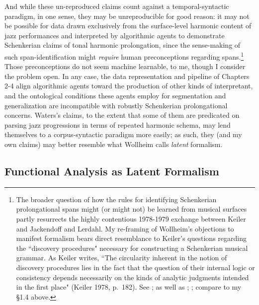 And while these un-reproduced claims count against a temporal-syntactic paradigm, in one sense, they may be unreproducible for good reason: it may not be possible for data drawn exclusively from the surface-level harmonic content of jazz performances and interpreted by algorithmic agents to demonstrate Schenkerian claims of tonal harmonic prolongation, since the sense-making of such span-identification might \emph{require} human preconceptions regarding spans.\footnote{The broader question of how the rules for identifying Schenkerian prolongational spans might (or might not) be learned from musical surfaces partly resurrects the highly contentious 1978-1979 exchange between Keiler and Jackendoff and Lerdahl.  My re-framing of Wollheim's objections to manifest formalism bears direct resemblance to Keiler's questions regarding the ``discovery procedures" necessary for constructing a Schenkerian musical grammar. As Keiler writes, ``The circularity inherent in the notion of discovery procedures lies in the fact that the question of their internal logic or consistency depends necessarily on the kinds of analytic judgments intended in the first place" (Keiler 1978, p.\ 182).  See \cite{keiler1978}; as well as \cite{jackendoff1979}; \cite{keiler1979}; compare to my \S 1.4 above.}  Those preconceptions do not seem machine learnable, to me, though I consider the problem open.  In any case, the data representation and pipeline of Chapters 2-4 align algorithmic agents toward the production of other kinds of interpretant, and the ontological conditions these agents employ for segmentation and generalization are incompatible with robustly Schenkerian prolongational concerns.  Waters's claims, to the extent that some of them are predicated on parsing jazz progressions in terms of repeated harmonic schema, may lend themselves to a corpus-syntactic paradigm more easily; as such, they (and my own claims) may better resemble what Wollheim calls \emph{latent} formalism.

\subsection{Functional Analysis as Latent Formalism}

